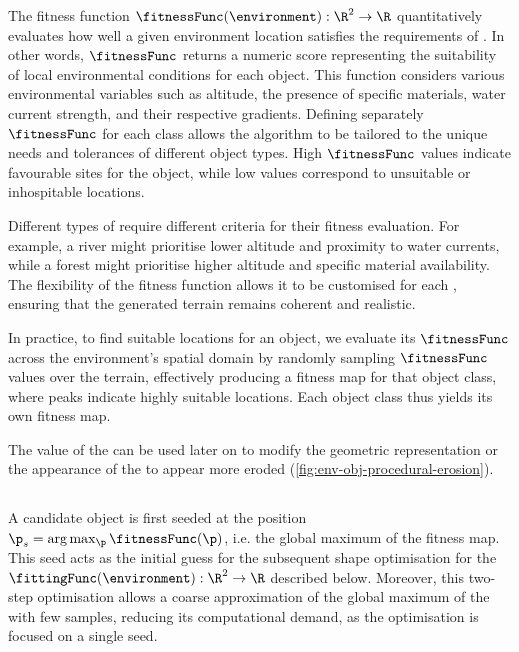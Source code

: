 The fitness function $\fitnessFunc(\environment): \R^2 \to \R$ quantitatively evaluates how well a given environment location satisfies the requirements of . In other words, $\fitnessFunc$ returns a numeric score representing the suitability of local environmental conditions for each object. This function considers various environmental variables such as altitude, the presence of specific materials, water current strength, and their respective gradients. Defining separately $\fitnessFunc$ for each  class allows the algorithm to be tailored to the unique needs and tolerances of different object types. High $\fitnessFunc$ values indicate favourable sites for the object, while low values correspond to unsuitable or inhospitable locations.

Different types of  require different criteria for their fitness evaluation. For example, a river might prioritise lower altitude and proximity to water currents, while a forest might prioritise higher altitude and specific material availability. The flexibility of the fitness function allows it to be customised for each , ensuring that the generated terrain remains coherent and realistic.

In practice, to find suitable locations for an object, we evaluate its $\fitnessFunc$ across the environment's spatial domain by randomly sampling $\fitnessFunc$ values over the terrain, effectively producing a fitness map for that object class, where peaks indicate highly suitable locations. Each object class thus yields its own fitness map. %

The value of the  can be used later on to modify the geometric representation or the appearance of the  to appear more eroded (\cref{fig:env-obj-procedural-erosion}).

\subsection{}
\label{sec:env-obj-fitting-func}

A candidate object is first seeded at the position $\p_s = \arg \max_\p \fitnessFunc(\p)$, i.e. the global maximum of the fitness map. This seed acts as the initial guess for the subsequent shape optimisation for the  $\fittingFunc(\environment): \R^2 \to \R$ described below. Moreover, this two-step optimisation allows a coarse approximation of the global maximum of the  with few samples, reducing its computational demand, as the  optimisation is focused on a single seed.

